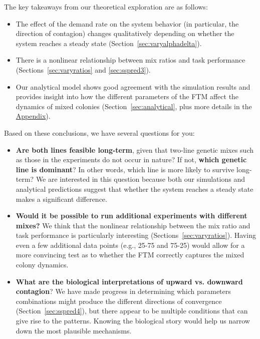 \documentclass[11pt]{article}
\begin{document}
The key takeaways from our theoretical exploration are as follows:
\begin{itemize}
    \item The effect of the demand rate on the system behavior (in particular, the direction of contagion) changes qualitatively depending on whether the system reaches a steady state (Section~\ref{sec:varyalphadelta}).
    
    \item There is a nonlinear relationship between mix ratios and task performance (Sections~\ref{sec:varyratios} and \ref{sec:sspred3}).
    
    \item Our analytical model shows good agreement with the simulation results and provides insight into how the different parameters of the FTM affect the dynamics of mixed colonies (Section~\ref{sec:analytical}, plus more details in the \hyperref[sec:appendix]{Appendix}).
\end{itemize}
\noindent Based on these conclusions, we have several questions for you:
\begin{itemize}
    \item \textbf{Are both lines feasible long-term}, given that two-line genetic mixes such as those in the experiments do not occur in nature? If not, \textbf{which genetic line is dominant}? In other words, which line is more likely to survive long-term? We are interested in this question because both our simulations and analytical predictions suggest that whether the system reaches a steady state makes a significant difference.
    
    \item \textbf{Would it be possible to run additional experiments with different mixes?} We think that the nonlinear relationship between the mix ratio and task performance is particularly interesting (Sections~\ref{sec:varyratios}). Having even a few additional data points (e.g., 25-75 and 75-25) would allow for a more convincing test as to whether the FTM correctly captures the mixed colony dynamics.
    
    \item \textbf{What are the biological interpretations of upward vs. downward contagion}? We have made progress in determining which parameters combinations might produce the different directions of convergence (Section~\ref{sec:sspred4}), but there appear to be multiple conditions that can give rise to the patterns. Knowing the biological story would help us narrow down the most plausible mechanisms.
\end{itemize}
\end{document}
